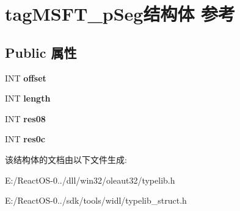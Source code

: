 \hypertarget{structtag_m_s_f_t__p_seg}{}\section{tag\+M\+S\+F\+T\+\_\+p\+Seg结构体 参考}
\label{structtag_m_s_f_t__p_seg}
\subsection*{Public 属性}
\begin{DoxyCompactItemize}
\item 
\mbox{\label{structtag_m_s_f_t__p_seg_a1679aca5fd9ed3b6fc085a7e5934231f}} 
I\+NT {\bfseries offset}
\item 
\mbox{\label{structtag_m_s_f_t__p_seg_af57028b64b03742fdf0030413fe51f4d}} 
I\+NT {\bfseries length}
\item 
\mbox{\label{structtag_m_s_f_t__p_seg_a09ac14d38f71374a05dc807b0d82c3e6}} 
I\+NT {\bfseries res08}
\item 
\mbox{\label{structtag_m_s_f_t__p_seg_a6795b28ca3622606291e690b7b768b21}} 
I\+NT {\bfseries res0c}
\end{DoxyCompactItemize}


该结构体的文档由以下文件生成\+:\begin{DoxyCompactItemize}
\item 
E\+:/\+React\+O\+S-\/0../dll/win32/oleaut32/typelib.\+h\item 
E\+:/\+React\+O\+S-\/0../sdk/tools/widl/typelib\+\_\+struct.\+h\end{DoxyCompactItemize}
